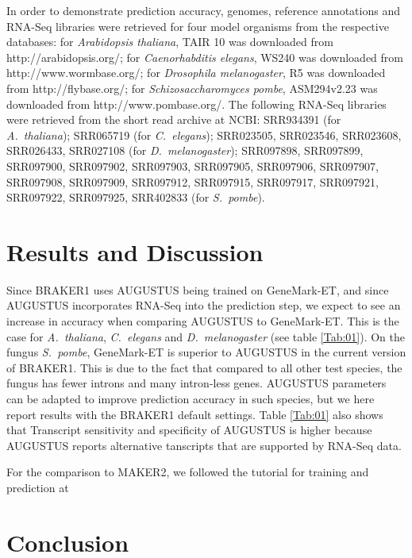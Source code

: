 \documentclass{bioinfo}
\begin{document}
\begin{methods}
In order to demonstrate prediction accuracy, genomes, reference annotations and RNA-Seq libraries were retrieved for four model organisms from the respective databases: for \textit{Arabidopsis thaliana}, TAIR 10 was downloaded from http://arabidopsis.org/; for \textit{Caenorhabditis elegans}, WS240 was downloaded from http://www.wormbase.org/; for \textit{Drosophila melanogaster}, R5 was downloaded from http://flybase.org/; for \textit{Schizosaccharomyces pombe}, ASM294v2.23 was downloaded from http://www.pombase.org/. The following RNA-Seq libraries were retrieved from the short read archive at NCBI: SRR934391 (for \textit{A.~thaliana}); SRR065719 (for \textit{C.~elegans}); SRR023505, SRR023546, SRR023608, SRR026433, SRR027108 (for \textit{D.~melanogaster}); SRR097898, SRR097899, SRR097900, SRR097902, SRR097903,
SRR097905, SRR097906, SRR097907, SRR097908, SRR097909,
SRR097912, SRR097915, SRR097917, SRR097921, SRR097922,
SRR097925, SRR402833 (for \textit{S.~pombe}).



\end{methods}


\section{Results and Discussion}

Since BRAKER1 uses AUGUSTUS being trained on GeneMark-ET, and since AUGUSTUS incorporates RNA-Seq into the prediction step, we expect to see an increase in accuracy when comparing AUGUSTUS to GeneMark-ET. This is the case for \textit{A.~thaliana}, \textit{C.~elegans} and \textit{D.~melanogaster} (see table \ref{Tab:01}). On the fungus \textit{S.~pombe}, GeneMark-ET is superior to AUGUSTUS in the current version of BRAKER1. This is due to the fact that compared to all other test species, the fungus has fewer introns and many intron-less genes. AUGUSTUS parameters can be adapted to improve prediction accuracy in such species, but we here report results with the BRAKER1 default settings. Table \ref{Tab:01} also shows that Transcript sensitivity and specificity of AUGUSTUS is higher because AUGUSTUS reports alternative tanscripts that are supported by RNA-Seq data. 

For the comparison to MAKER2, we followed the tutorial for training and prediction at 






\section{Conclusion}
\end{document}
